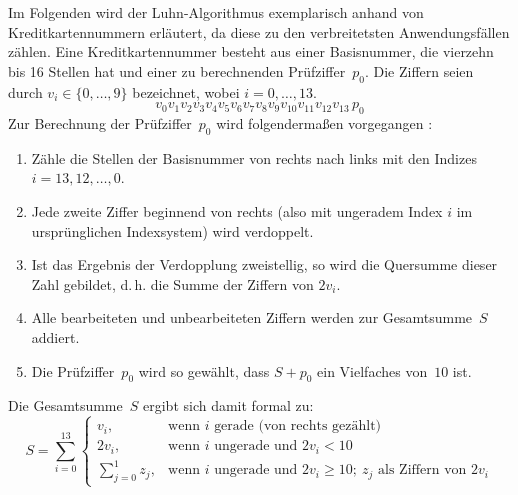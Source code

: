 Im Folgenden wird der Luhn-Algorithmus exemplarisch anhand von Kreditkartennummern erläutert, da diese zu den verbreitetsten Anwendungsfällen zählen. Eine Kreditkartennummer besteht aus einer Basisnummer, die vierzehn bis 16 Stellen hat und einer zu berechnenden Prüfziffer~$p_0$. Die Ziffern seien durch $v_i \in \{0, \dots, 9\}$ bezeichnet, wobei $i = 0, \dots, 13$. \newline
\begin{equation}
\label{eq:Luhn}
v_0 v_1 v_2 v_3 v_4 v_5 v_6 v_7 v_8 v_9 v_{10} v_{11} v_{12} v_{13} \, p_0
\end{equation}
Zur Berechnung der Prüfziffer~$p_0$ wird folgendermaßen vorgegangen \cite{Luhn_Algorithmus}:

\begin{enumerate}
  \item Zähle die Stellen der Basisnummer von rechts nach links mit den Indizes $i = 13, 12, \dots, 0$.
  \item Jede zweite Ziffer beginnend von rechts (also mit ungeradem Index $i$ im ursprünglichen Indexsystem) wird verdoppelt.
  \item Ist das Ergebnis der Verdopplung zweistellig, so wird die Quersumme dieser Zahl gebildet, d.\,h. die Summe der Ziffern von $2v_i$.
  \item Alle bearbeiteten und unbearbeiteten Ziffern werden zur Gesamtsumme~$S$ addiert.
  \item Die Prüfziffer~$p_0$ wird so gewählt, dass $S + p_0$ ein Vielfaches von~$10$ ist.
\end{enumerate}

Die Gesamtsumme~$S$ ergibt sich damit formal zu: \newline \begin{equation}
\label{eq:Luhn-Summe-fallunterscheidung}
S = \sum_{i=0}^{13}
\begin{cases}
v_i, & \text{wenn $i$ gerade (von rechts gezählt)} \\
2v_i, & \text{wenn $i$ ungerade und } 2v_i < 10 \\
\displaystyle \sum_{j=0}^{1} z_j, & \text{wenn $i$ ungerade und } 2v_i \geq 10;\ z_j \text{ als Ziffern von } 2v_i
\end{cases}
\end{equation}

